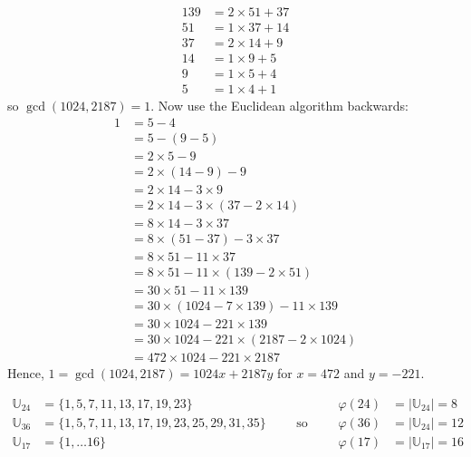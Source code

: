 \documentclass[11pt]{article}
\begin{document}
\begin{itemize}
\begin{align*}
       139 &= 2\times   51 +  37\\
        51 &= 1\times   37 +  14\\
        37 &= 2\times   14 +   9\\
        14 &= 1\times    9 +   5\\
         9 &= 1\times    5 +   4\\
         5 &= 1\times    4 +   1
    \end{align*}
    so $\gcd(1024,2187) = 1$.
    Now use the Euclidean algorithm backwards:
    \begin{align*}
       1 &=   5 - 4\\
         &=   5 - (9 - 5)\\
         &=   2\times 5 - 9\\
         &=   2\times(14 - 9) - 9\\
         &=   2\times 14 - 3\times 9\\
         &=   2\times 14 - 3\times(37 - 2\times 14)\\
         &=   8\times 14 - 3\times 37\\
         &=   8\times(51-37) - 3\times 37\\
         &=   8\times 51 - 11\times 37\\
         &=   8\times 51 - 11\times(139 - 2\times 51)\\
         &=  30\times 51 - 11\times 139\\
         &=  30\times(1024 - 7\times 139) - 11\times 139\\
         &=  30\times 1024 - 221\times 139\\
         &=  30\times 1024 - 221\times(2187-2\times 1024)\\
         &=  472\times 1024 - 221\times 2187
    \end{align*}
    Hence, $1 = \gcd(1024,2187) = 1024x + 2187y$ for $x = 472$ and $y = -221$.
\end{itemize}

\bigskip{}
\[
  \begin{array}{rl}
    \mathbb{U}_{24} &= \{ 1,5,7,11,13,17,19,23\}\\
    \mathbb{U}_{36} &= \{ 1,5,7,11,13,17,19,23,25,29,31,35\}\\
    \mathbb{U}_{17} &= \{ 1,\ldots 16\}
  \end{array}
  \qquad\textrm{so}\qquad
  \begin{array}{rl}
    \varphi(24) &= |\mathbb{U}_{24}| = 8\\
    \varphi(36) &= |\mathbb{U}_{24}| = 12\\
    \varphi(17) &= |\mathbb{U}_{17}| = 16
  \end{array}
\]
\end{document}
